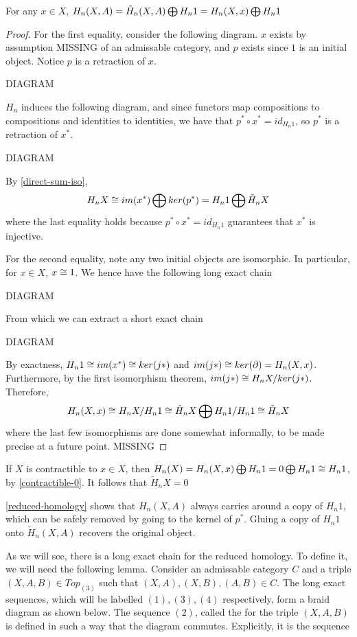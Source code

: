 \begin{prop}
\label{reduced-homology}
For any $x\in X$,
$H_n(X,A)=\tilde{H}_n(X,A)\bigoplus H_n1=H_n(X,x)\bigoplus H_n1$
\end{prop}

\begin{proof}
For the first equality, consider the following diagram. $x$ exists by assumption MISSING of an admissable category, and $p$ exists since $1$ is an initial object. Notice $p$ is a retraction of $x$.

DIAGRAM

$H_n$ induces the following diagram, and since functors map compositions to compositions and identities to identities, we have that $p^*\circ x^*=id_{H_n1}$, so $p^*$ is a retraction of $x^*$.

DIAGRAM

By \ref{direct-sum-iso}, $$H_nX\cong im(x^*)\bigoplus ker(p^*)= H_n1\bigoplus \tilde{H}_nX$$
where the last equality holds because $p^*\circ x^* = id_{H_n1}$ guarantees that $x^*$ is injective.

For the second equality, note any two initial objects are isomorphic. In particular, for $x\in X$, $x\cong 1$. We hence have the following long exact chain

DIAGRAM

From which we can extract a short exact chain

DIAGRAM

By exactness, $H_n1\cong im(x^*)\cong ker(j*)$ and $im(j*)\cong ker(\partial)=H_n(X,x)$. Furthermore, by the first isomorphism theorem, $im(j*)\cong H_nX/ker(j*)$. Therefore, $$H_n(X,x)\cong H_nX/H_n1\cong \tilde{H}_nX\bigoplus H_n1/H_n1 \cong \tilde{H}_nX$$
where the last few isomorphisms are done somewhat informally, to be made precise at a future point. MISSING
\end{proof}

\begin{corollary}
If $X$ is contractible to $x\in X$, then $H_n(X)=H_n(X,x)\bigoplus H_n1=0\bigoplus H_n1\cong H_n1$, by \ref{contractible-0}. It follows that $\tilde{H}_nX=0$
\end{corollary}

\ref{reduced-homology} shows that $H_n(X,A)$ always carries around a copy of $H_n1$, which can be safely removed by going to the kernel of $p^*$. Gluing a copy of $H_n1$ onto $\tilde{H}_n(X,A)$ recovers the original object.

As we will see, there is a long exact chain for the reduced homology. To define it, we will need the following lemma. Consider an admissable category $C$ and a triple $(X,A,B)\in Top_{(3)}$ such that $(X,A),(X,B),(A,B)\in C$. The long exact sequences, which will be labelled $(1),(3),(4)$ respectively, form a braid diagram as shown below. The sequence $(2)$, called the  for the triple $(X,A,B)$ is defined in such a way that the diagram commutes. Explicitly, it is the sequence

